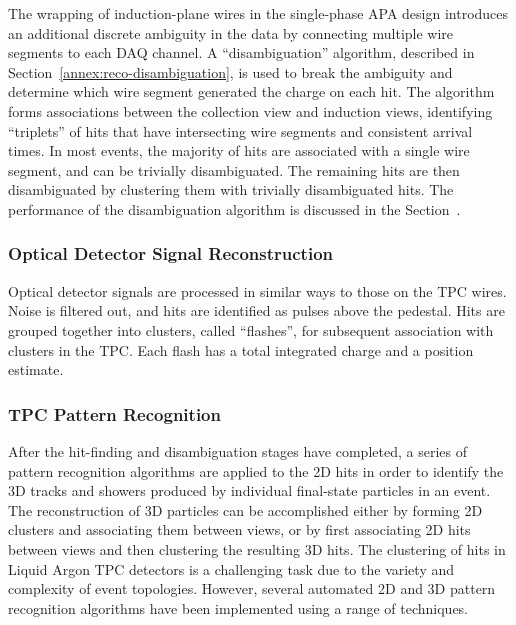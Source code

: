 The wrapping of induction-plane wires in the single-phase APA design
introduces an additional discrete ambiguity in the data by connecting multiple wire
segments to each DAQ channel. A ``disambiguation'' algorithm,
described in Section~\ref{annex:reco-disambiguation}, is used to break the
ambiguity and determine which wire segment generated the charge on each hit.
The algorithm forms associations between the collection view and induction views,
identifying ``triplets'' of hits that have intersecting wire segments
and consistent arrival times. In most events, the majority of hits are
associated with a single wire segment, and can be trivially disambiguated.
The remaining hits are then disambiguated by clustering them with trivially disambiguated hits.
The performance of the disambiguation algorithm is discussed in the Section~\cite{annex:disambiguation}.





\subsubsection{Optical Detector Signal Reconstruction}

Optical detector signals are processed in similar ways to those on the TPC wires.
Noise is filtered out, and hits are identified as pulses above the pedestal.
Hits are grouped together into clusters, called ``flashes'', for subsequent
association with clusters in the TPC.  Each flash has a total integrated charge and a position
estimate.


\subsubsection{TPC Pattern Recognition}

After the hit-finding and disambiguation stages have completed, a series of 
pattern recognition algorithms are applied to the 2D hits in order to identify 
the 3D tracks and showers produced by individual final-state particles in an event.
The reconstruction of 3D particles can be accomplished either by forming 2D clusters
and associating them between views, or by first associating 2D hits between views
and then clustering the resulting 3D hits. 
The clustering of hits in Liquid Argon TPC detectors is a challenging task
due to the variety and complexity of event topologies.
However, several automated 2D and 3D pattern recognition algorithms have been 
implemented using a range of techniques.

